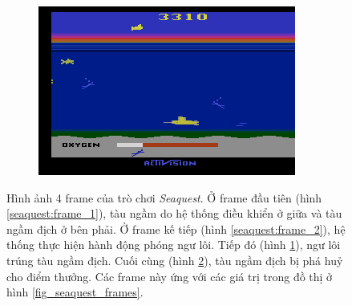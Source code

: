 \begin{figure}
\begin{subfigure}{.5\textwidth}
			\caption{}
			\label{seaquest:frame_3}
		\end{subfigure}%
		\begin{subfigure}{.5\textwidth}
			\centering
			\includegraphics[width=.8\linewidth]{008191}
			\caption{}
			\label{seaquest:frame_4}
		\end{subfigure}%
		\caption[Hình ảnh một số frame của trò chơi \textit{Seaquest}]{Hình ảnh 4 frame của trò chơi \textit{Seaquest}.
		Ở frame đầu tiên (hình \ref{seaquest:frame_1}), tàu ngầm do hệ thống điều khiển ở giữa và tàu ngầm địch ở bên phải.
		Ở frame kế tiếp (hình \ref{seaquest:frame_2}), hệ thống thực hiện hành động phóng ngư lôi.
		Tiếp đó (hình \ref{seaquest:frame_3}), ngư lôi trúng tàu ngầm địch.
		Cuối cùng (hình \ref{seaquest:frame_4}), tàu ngầm địch bị phá huỷ cho điểm thưởng.
		Các frame này ứng với các giá trị trong đồ thị ở hình \ref{fig_seaquest_frames}.}
		\label{seaquest:frames}
	\end{figure}
	
